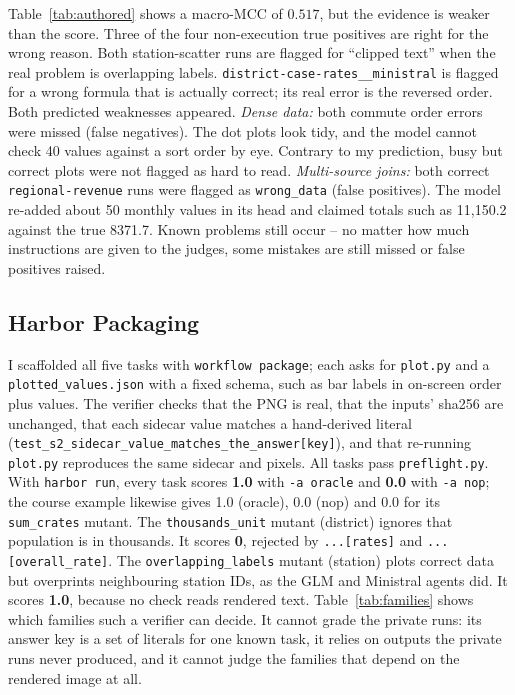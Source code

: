 \documentclass[11pt]{article}
\begin{document}
Table~\ref{tab:authored} shows a macro-MCC of $0.517$, but the evidence is
weaker than the score. Three of the four non-execution true positives are right
for the wrong reason. Both station-scatter runs are flagged for ``clipped text''
when the real problem is overlapping labels. \texttt{district-case-rates\_\_ministral}
is flagged for a wrong formula that is actually correct; its real error is the
reversed order. Both predicted weaknesses appeared. \emph{Dense data:} both
commute order errors were missed (false negatives). The dot plots look tidy,
and the model cannot check 40 values against a sort order by eye. Contrary to
my prediction, busy but correct plots were not flagged as hard to read.
\emph{Multi-source joins:} both correct \texttt{regional-revenue} runs were
flagged as \texttt{wrong\_data} (false positives). The model re-added about 50
monthly values in its head and claimed totals such as 11{,}150.2 against the
true 8371.7. Known problems still occur -- no matter how much instructions are given to the judges, some mistakes are still missed or false positives raised.

\subsection{Harbor Packaging}
I scaffolded all five tasks with \texttt{workflow package}; each asks for
\texttt{plot.py} and a \texttt{plotted\_values.json} with a fixed schema,
such as bar labels in on-screen order plus values. The verifier
checks that the PNG is real, that the inputs' sha256 are unchanged, that each
sidecar value matches a hand-derived literal
(\texttt{test\_s2\_sidecar\_value\_matches\_the\_answer[key]}), and that
re-running \texttt{plot.py} reproduces the same sidecar and pixels. All tasks
pass \texttt{preflight.py}. With \texttt{harbor run}, every task scores
\textbf{1.0} with \texttt{-a oracle} and \textbf{0.0} with \texttt{-a nop}; the
course example likewise gives 1.0 (oracle), 0.0 (nop) and 0.0 for its
\texttt{sum\_crates} mutant. The \texttt{thousands\_unit} mutant (district) ignores
that population is in thousands. It scores \textbf{0}, rejected by
\texttt{...[rates]} and \texttt{...[overall\_rate]}. The
\texttt{overlapping\_labels} mutant (station) plots correct data but overprints
neighbouring station IDs, as the GLM and Ministral agents did. It scores
\textbf{1.0}, because no check reads rendered text. Table~\ref{tab:families}
shows which families such a verifier can decide. It cannot grade the private
runs: its answer key is a set of literals for one known task, it relies on
outputs the private runs never produced, and it cannot judge the families that
depend on the rendered image at all.
\end{document}
